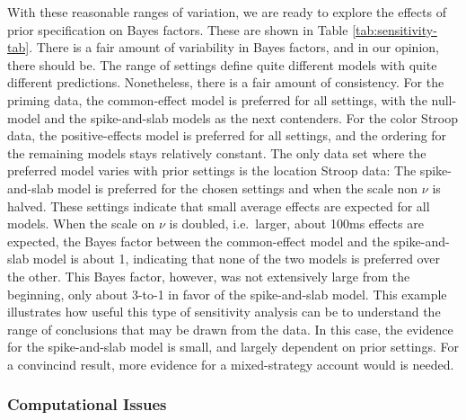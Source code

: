 \documentclass[english,man]{apa6}
\theoremstyle{definition}
\theoremstyle{definition}
\theoremstyle{remark}
\begin{document}
With these reasonable ranges of variation, we are ready to explore the
effects of prior specification on Bayes factors. These are shown in
Table \ref{tab:sensitivity-tab}. There is a fair amount of variability
in Bayes factors, and in our opinion, there should be. The range of
settings define quite different models with quite different predictions.
Nonetheless, there is a fair amount of consistency. For the priming
data, the common-effect model is preferred for all settings, with the
null-model and the spike-and-slab models as the next contenders. For the
color Stroop data, the positive-effects model is preferred for all
settings, and the ordering for the remaining models stays relatively
constant. The only data set where the preferred model varies with prior
settings is the location Stroop data: The spike-and-slab model is
preferred for the chosen settings and when the scale non \(\nu\) is
halved. These settings indicate that small average effects are expected
for all models. When the scale on \(\nu\) is doubled, i.e.~larger, about
100ms effects are expected, the Bayes factor between the common-effect
model and the spike-and-slab model is about 1, indicating that none of
the two models is preferred over the other. This Bayes factor, however,
was not extensively large from the beginning, only about 3-to-1 in favor
of the spike-and-slab model. This example illustrates how useful this
type of sensitivity analysis can be to understand the range of
conclusions that may be drawn from the data. In this case, the evidence
for the spike-and-slab model is small, and largely dependent on prior
settings. For a convincind result, more evidence for a mixed-strategy
account would is needed.

\subsubsection{Computational Issues}\label{computational-issues}
\end{document}
